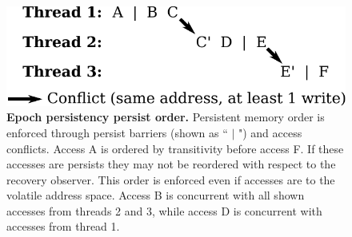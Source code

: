 \begin{figure}
  \centering
  \includegraphics[width=.55\linewidth]{PersistencyModels/propagation.pdf}
  \caption{\textbf{Epoch persistency persist order.} Persistent memory order is enforced through persist barriers (shown as `` $\vert$ ") and access conflicts.  Access A is ordered by transitivity before access F.  If these accesses are persists they may not be reordered with respect to the recovery observer.  This order is enforced even if accesses are to the volatile address space.  Access B is concurrent with all shown accesses from threads 2 and 3, while access D is concurrent with accesses from thread 1.}
  \label{fig::EpochPersistencyPropagation}
\end{figure}
